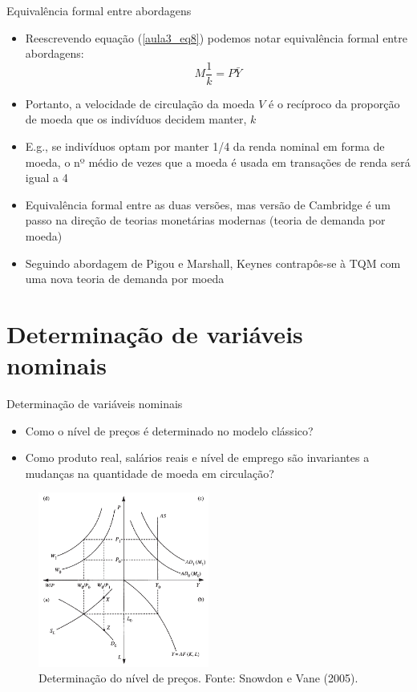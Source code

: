 \documentclass[10pt]{beamer}
\begin{document}
\begin{frame}
    {Equivalência formal entre abordagens}
    \begin{itemize}
        \item Reescrevendo equação (\ref{aula3_eq8}) podemos notar equivalência formal entre abordagens:
        \[
          M\frac{1}{k} = P\bar{Y}  
        \]
        \item Portanto, a velocidade de circulação da moeda $V$ é o recíproco da proporção de moeda que os indivíduos decidem manter, $k$\bigskip
        \item E.g., se indivíduos optam por manter 1/4 da renda nominal em forma de moeda, o nº médio de vezes que a moeda é usada em transações de renda será igual a 4\bigskip
        \item Equivalência formal entre as duas versões, mas versão de Cambridge é um passo na direção de teorias monetárias modernas (teoria de demanda por moeda)\bigskip
        \item Seguindo abordagem de Pigou e Marshall, Keynes contrapôs-se à TQM com uma nova teoria de demanda por moeda
    \end{itemize}
\end{frame}

\section{Determinação de variáveis nominais}

\begin{frame}
    {Determinação de variáveis nominais}
    \begin{itemize}
        \item Como o nível de preços é determinado no modelo clássico?\bigskip
        \item Como produto real, salários reais e nível de emprego são invariantes a mudanças na quantidade de moeda em circulação?
    \end{itemize}
\end{frame}

\begin{frame}
    \begin{figure}
        \centering
        \includegraphics[width=0.5\textwidth]{./figures/aula3_fig3.PNG}
        \caption{Determinação do nível de preços. Fonte: Snowdon e Vane (2005).}
        \label{aula3_fig3}
    \end{figure}
\end{frame}
\end{document}
